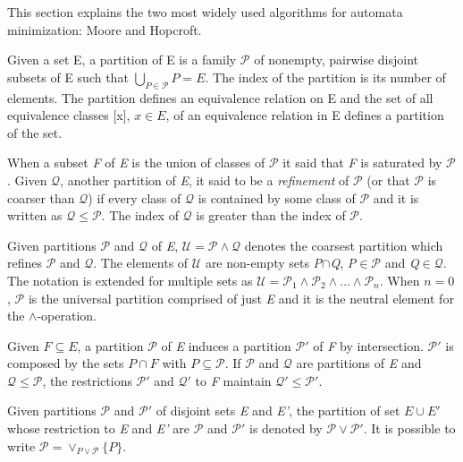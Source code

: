 {This section explains the two most widely used algorithms for automata minimization: Moore and Hopcroft.

\begin{definition}\label{def:partition}
Given a set E, a partition of E is a family $\mathcal{P}$ of nonempty, pairwise disjoint subsets of E such that $\bigcup_{P\in\mathcal{P}}P = E $. The index of the partition is its number of elements. The partition defines an equivalence relation on E and the set of all equivalence classes [x], $x\in E$, of an equivalence relation in E defines a partition of the set.
\end{definition}

When a subset \textit{F} of \textit{E} is the union of classes of $\mathcal{P}$ it said that \textit{F} is saturated by $\mathcal{P}$. Given $\mathcal{Q}$, another partition of \textit{E}, it said to be a \textit{refinement} of $\mathcal{P}$ (or that $\mathcal{P}$ is coarser than $\mathcal{Q}$) if every class of $\mathcal{Q}$ is contained by some class of $\mathcal{P}$ and it is written as $\mathcal{Q} \leq \mathcal{P}$. The index of $\mathcal{Q}$ is greater than the index of $\mathcal{P}$.

Given partitions $\mathcal{P}$ and $\mathcal{Q}$ of \textit{E}, $\mathcal{U} = \mathcal{P}\wedge\mathcal{Q}$ denotes the coarsest partition which refines $\mathcal{P}$ and $\mathcal{Q}$. The elements of $\mathcal{U}$ are non-empty sets \textit{P}$\cap$\textit{Q}, \textit{P}$\in\mathcal{P}$ and \textit{Q}$\in\mathcal{Q}$. The notation is extended for multiple sets as $\mathcal{U} = \mathcal{P}_1 \wedge \mathcal{P}_2 \wedge \ldots \wedge \mathcal{P}_n$. When $n=0$,  $\mathcal{P}$ is the universal partition comprised of just \textit{E} and it is the neutral element for the $\wedge$-operation.

Given $F\subseteq E$, a partition $\mathcal{P}$ of \textit{E} induces a partition $\mathcal{P}'$  
of \textit{F} by intersection. $\mathcal{P}'$ is composed by the sets $P\cap F$ with $P\subseteq \mathcal{P}$. If $\mathcal{P}$ and $\mathcal{Q}$ are partitions of \textit{E} and $\mathcal{Q} \leq \mathcal{P}$, the restrictions $\mathcal{P}'$ and $\mathcal{Q}'$ to \textit{F} maintain $\mathcal{Q}' \leq \mathcal{P}'$.

Given partitions $\mathcal{P}$ and $\mathcal{P}'$ of disjoint sets \textit{E} and \textit{E'}, the partition of set $E \cup E'$ whose restriction to \textit{E} and \textit{E'} are $\mathcal{P}$ and $\mathcal{P'}$ is denoted by $\mathcal{P}\vee\mathcal{P}'$. It is possible to write $\mathcal{P} = \vee_{P\vee\mathcal{P}}\{P\}$.

}
